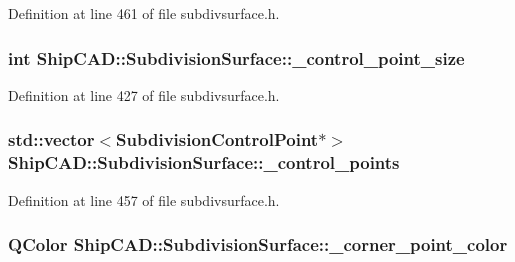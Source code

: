 Definition at line 461 of file subdivsurface.\+h.

\subsubsection[{\texorpdfstring{\+\_\+control\+\_\+point\+\_\+size}{_control_point_size}}]{\setlength{\rightskip}{0pt plus 5cm}int Ship\+C\+A\+D\+::\+Subdivision\+Surface\+::\+\_\+control\+\_\+point\+\_\+size\hspace{0.3cm}{\ttfamily [protected]}}\hypertarget{classShipCAD_1_1SubdivisionSurface_a7ad820b9d312c8ecde939b5345690d35}{}\label{classShipCAD_1_1SubdivisionSurface_a7ad820b9d312c8ecde939b5345690d35}


Definition at line 427 of file subdivsurface.\+h.

\subsubsection[{\texorpdfstring{\+\_\+control\+\_\+points}{_control_points}}]{\setlength{\rightskip}{0pt plus 5cm}std\+::vector$<${\bf Subdivision\+Control\+Point}$\ast$$>$ Ship\+C\+A\+D\+::\+Subdivision\+Surface\+::\+\_\+control\+\_\+points\hspace{0.3cm}{\ttfamily [protected]}}\hypertarget{classShipCAD_1_1SubdivisionSurface_a906d5981dc482ede1bb3c7256e750945}{}\label{classShipCAD_1_1SubdivisionSurface_a906d5981dc482ede1bb3c7256e750945}


Definition at line 457 of file subdivsurface.\+h.

\subsubsection[{\texorpdfstring{\+\_\+corner\+\_\+point\+\_\+color}{_corner_point_color}}]{\setlength{\rightskip}{0pt plus 5cm}Q\+Color Ship\+C\+A\+D\+::\+Subdivision\+Surface\+::\+\_\+corner\+\_\+point\+\_\+color\hspace{0.3cm}{\ttfamily [protected]}}\hypertarget{classShipCAD_1_1SubdivisionSurface_aba9fae36ed19b802707c748396c1fd63}{}\label{classShipCAD_1_1SubdivisionSurface_aba9fae36ed19b802707c748396c1fd63}


